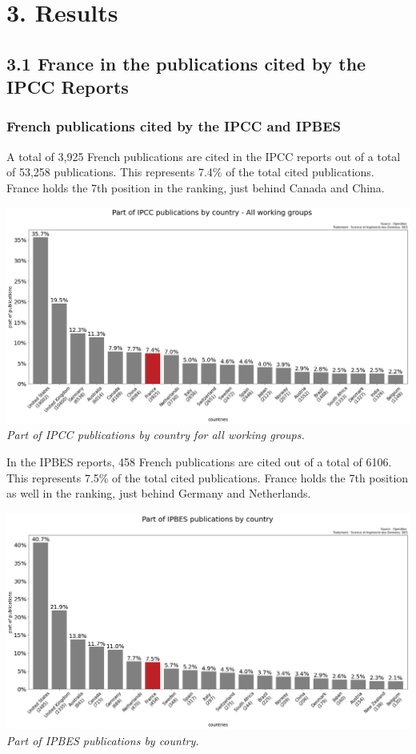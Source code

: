 \documentclass[
]{article}
\begin{document}
\hypertarget{results}{%
\section{3. Results}\label{results}}

\hypertarget{france-in-the-publications-cited-by-the-ipcc-reports}{%
\subsection{3.1 France in the publications cited by the IPCC
Reports}\label{france-in-the-publications-cited-by-the-ipcc-reports}}

\hypertarget{french-publications-cited-by-the-ipcc-and-ipbes}{%
\subsubsection{French publications cited by the IPCC and
IPBES}\label{french-publications-cited-by-the-ipcc-and-ipbes}}

A total of 3,925 French publications are cited in the IPCC reports out
of a total of 53,258 publications. This represents 7.4\% of the total
cited publications. France holds the 7th position in the ranking, just
behind Canada and China.

\includegraphics{./images/teds_ipcc_country_wg122cross3_part.png}
\emph{Part of IPCC publications by country for all working groups.}

In the IPBES reports, 458 French publications are cited out of a total
of 6106. This represents 7.5\% of the total cited publications. France
holds the 7th position as well in the ranking, just behind Germany and
Netherlands.

\includegraphics{./images/teds_ipbes_country_wg122cross3_part.png}
\emph{Part of IPBES publications by country.}
\end{document}
